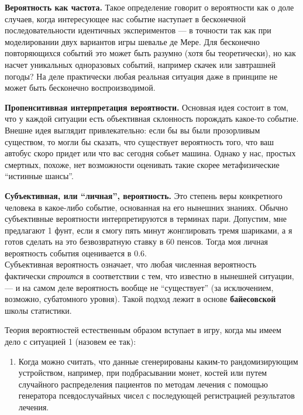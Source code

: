 \documentclass[11pt,a4paper]{article}
\providecommand{\tightlist}{%
      \setlength{\itemsep}{0pt}\setlength{\parskip}{0pt}}
\begin{document}
\textbf{Вероятность как частота.} Такое определение говорит о
вероятности как о доле случаев, когда интересующее нас событие наступает
в бесконечной последовательности идентичных экспериментов --- в точности
так как при моделировании двух вариантов игры шевалье де Мере. Для
бесконечно повторяющихся событий это может быть разумно (хотя бы
теоретически), но как насчет уникальных одноразовых событий, например
скачек или завтрашней погоды? На деле практически любая реальная
ситуация даже в принципе не может быть бесконечно воспроизводимой.

\textbf{Пропенситивная интерпретация вероятности.} Основная идея состоит
в том, что у каждой ситуации есть объективная склонность порождать
какое-то событие. Внешне идея выглядит привлекательно: если бы вы были
прозорливым существом, то могли бы сказать, что существует вероятность
того, что ваш автобус скоро придет или что вас сегодня собьет машина.
Однако у нас, простых смертных, похоже, нет возможности оценивать такие
скорее метафизические ``истинные шансы''.

\textbf{Субъективная, или ``личная'', вероятность.} Это степень веры
конкретного человека в какое-либо событие, основанная на его нынешних
знаниях. Обычно субъективные вероятности интерпретируются в терминах
пари. Допустим, мне предлагают 1 фунт, если я смогу пять минут
жонглировать тремя шариками, а я готов сделать на это безвозвратную
ставку в 60 пенсов. Тогда моя личная вероятность события оценивается в
0.6.\\
Субъективная вероятность означает, что любая численная вероятность
фактически \emph{строится} в соответствии с тем, что известно в нынешней
ситуации, --- и на самом деле вероятность вообще не ``существует'' (за
исключением, возможно, субатомного уровня). Такой подход лежит в основе
\textbf{байесовской} школы статистики.

    Теория вероятностей естественным образом вступает в игру, когда мы имеем
дело с ситуацией 1 (назовем ее так):

\begin{enumerate}
\def\labelenumi{\arabic{enumi}.}
\tightlist
\item
  Когда можно считать, что данные сгенерированы каким-то рандомизирующим
  устройством, например, при подбрасывании монет, костей или путем
  случайного распределения пациентов по методам лечения с помощью
  генератора псевдослучайных чисел с последующей регистрацией
  результатов лечения.
\end{enumerate}
\end{document}
